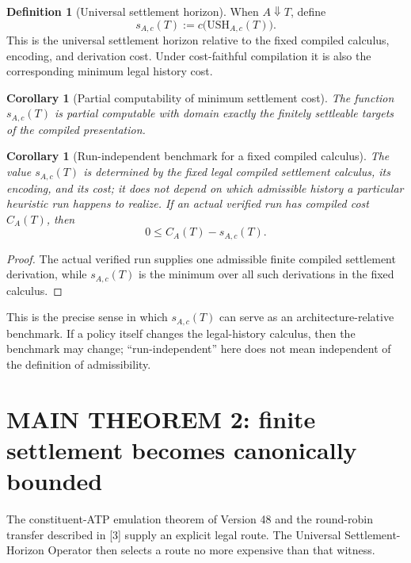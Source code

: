\documentclass[11pt]{article}
\newtheorem{corollary}[theorem]{Corollary}
\theoremstyle{definition}
\newtheorem{definition}[theorem]{Definition}
\newcommand{\USH}{\ensuremath{\mathrm{USH}}}
\begin{document}
\begin{definition}[Universal settlement horizon]
When $A\Downarrow T$, define
\[
s_{A,c}(T):=c\bigl(\USH_{A,c}(T)\bigr).
\]
This is the universal settlement horizon relative to the fixed compiled calculus, encoding, and derivation cost. Under cost-faithful compilation it is also the corresponding minimum legal history cost.
\end{definition}

\begin{corollary}[Partial computability of minimum settlement cost]
The function $s_{A,c}(T)$ is partial computable with domain exactly the finitely settleable targets of the compiled presentation.
\end{corollary}

\begin{corollary}[Run-independent benchmark for a fixed compiled calculus]
The value $s_{A,c}(T)$ is determined by the fixed legal compiled settlement calculus, its encoding, and its cost; it does not depend on which admissible history a particular heuristic run happens to realize. If an actual verified run has compiled cost $C_A(T)$, then
\[
0\le C_A(T)-s_{A,c}(T).
\]
\end{corollary}

\begin{proof}
The actual verified run supplies one admissible finite compiled settlement derivation, while $s_{A,c}(T)$ is the minimum over all such derivations in the fixed calculus.
\end{proof}

This is the precise sense in which $s_{A,c}(T)$ can serve as an architecture-relative benchmark. If a policy itself changes the legal-history calculus, then the benchmark may change; ``run-independent'' here does not mean independent of the definition of admissibility.

\section{MAIN THEOREM 2: finite settlement becomes canonically bounded}
The constituent-ATP emulation theorem of Version 48 and the round-robin transfer described in [3] supply an explicit legal route. The Universal Settlement-Horizon Operator then selects a route no more expensive than that witness.
\end{document}
